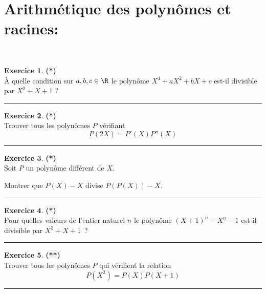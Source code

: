 \documentclass[a4paper,11pt]{article}
\theoremstyle{definition}
\newtheorem{exo}{Exercice} %
\begin{document}
\section*{Arithmétique des polynômes et racines:}\hfill\\%
\begin{minipage}{1\linewidth}
	\begin{minipage}[t]{0.48\linewidth}
		\raggedright
	
\begin{exo}\textbf{(*)}\quad\\[0.2cm]
	\`A quelle condition sur $a,b,c\in\R$ le polynôme 
	$X^4+aX^2+bX+c$ est-il divisible par $X^2+X+1$ ?
	
	\centering
	\rule{1\linewidth}{0.6pt}
\end{exo}



\begin{exo}\textbf{(*)}\quad\\[0.2cm]
 Trouver tous les polynômes $P$ vérifiant $$P(2X)=P'(X)P''(X)$$
 	
	\centering
	\rule{1\linewidth}{0.6pt}
\end{exo}

\begin{exo}\textbf{(*)}\quad\\[0.2cm]
 Soit $P$ un polynôme différent de $X$.
 
Montrer que $P(X)-X$ divise $P(P(X))-X$.

\centering
\rule{1\linewidth}{0.6pt}
\end{exo}

\begin{exo}\textbf{(*)}\quad\\[0.2cm]
Pour quelles valeurs de l'entier naturel $n$ le polynôme $(X+1)^n-X^n-1$ est-il divisible par $X^2+X+1$~?
	
	\centering
	\rule{1\linewidth}{0.6pt}
\end{exo}



\end{minipage}	
\hfill\vrule\hfill
\begin{minipage}[t]{0.48\linewidth}
\raggedright

\begin{exo}\textbf{(**)}\quad\\[0.2cm]
	
	Trouver tous les polynômes $P$ qui vérifient la relation 
	$$P(X^2)=P(X)P(X+1)$$
	
	\centering
	\rule{1\linewidth}{0.6pt}
\end{exo}


\end{minipage}
\end{minipage}
\end{document}
